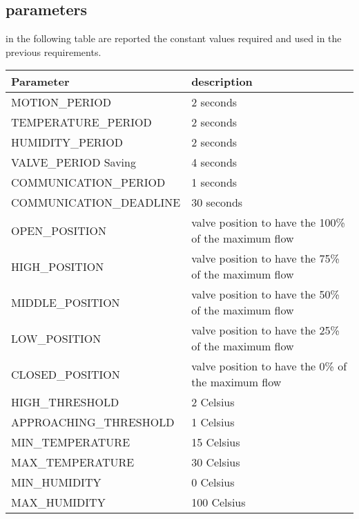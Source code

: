 \subsection{parameters}
in the following table are reported the constant values required and used in the previous requirements.
\begin{table}[H]
	\centering
			\begin{tabular}{||l | l||} 
			\hline
			\textbf{Parameter}		& \textbf{description} \\ 
			\hline
			MOTION\_PERIOD			& 2 seconds \\ 
			\hline
			TEMPERATURE\_PERIOD		& 2 seconds \\ 
			\hline
			HUMIDITY\_PERIOD		& 2 seconds \\ 
			\hline
			VALVE\_PERIOD Saving	& 4 seconds \\ 
			\hline
			COMMUNICATION\_PERIOD	& 1 seconds \\ 
			\hline
			COMMUNICATION\_DEADLINE	& 30 seconds \\ 
			\hline
			OPEN\_POSITION			& valve position to have the 100\% of the maximum flow \\ 
			\hline
			HIGH\_POSITION			& valve position to have the 75\% of the maximum flow \\ 
			\hline
			MIDDLE\_POSITION		& valve position to have the 50\% of the maximum flow \\ 
			\hline
			LOW\_POSITION			& valve position to have the 25\% of the maximum flow \\ 
			\hline
			CLOSED\_POSITION		& valve position to have the 0\% of the maximum flow \\ 
			\hline
			HIGH\_THRESHOLD			& 2 Celsius \degree \\ 
			\hline
			APPROACHING\_THRESHOLD	& 1 Celsius \degree \\ 
			\hline
			MIN\_TEMPERATURE		& 15 Celsius \degree \\ 
			\hline
			MAX\_TEMPERATURE		& 30 Celsius \degree \\ 
			\hline
			MIN\_HUMIDITY			& 0 Celsius \degree \\ 
			\hline
			MAX\_HUMIDITY			& 100 Celsius \degree \\ 
			\hline
		\end{tabular}
\end{table}
